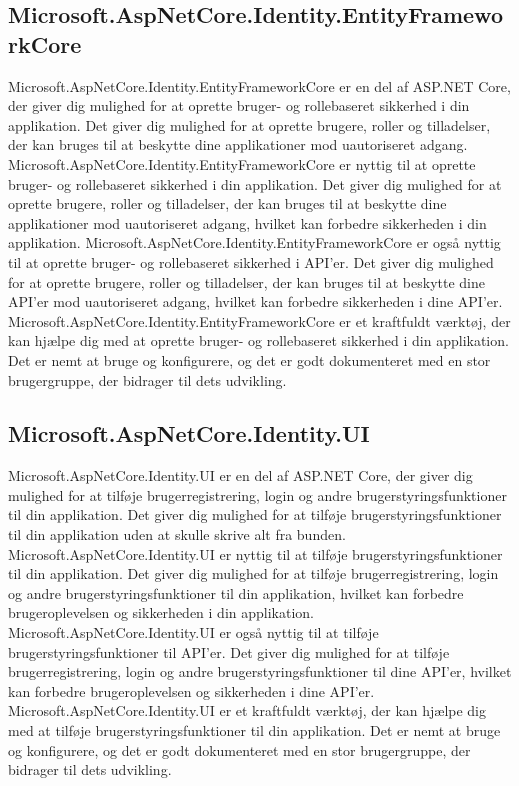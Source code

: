 \subsection{Microsoft.AspNetCore.Identity.EntityFrameworkCore}
Microsoft.AspNetCore.Identity.EntityFrameworkCore er en del af ASP.NET Core, der giver dig mulighed for at oprette bruger- og rollebaseret sikkerhed i din applikation. Det giver dig mulighed for at oprette brugere, roller og tilladelser, der kan bruges til at beskytte dine applikationer mod uautoriseret adgang.
Microsoft.AspNetCore.Identity.EntityFrameworkCore er nyttig til at oprette bruger- og rollebaseret sikkerhed i din applikation. Det giver dig mulighed for at oprette brugere, roller og tilladelser, der kan bruges til at beskytte dine applikationer mod uautoriseret adgang, hvilket kan forbedre sikkerheden i din applikation.
Microsoft.AspNetCore.Identity.EntityFrameworkCore er også nyttig til at oprette bruger- og rollebaseret sikkerhed i API'er. Det giver dig mulighed for at oprette brugere, roller og tilladelser, der kan bruges til at beskytte dine API'er mod uautoriseret adgang, hvilket kan forbedre sikkerheden i dine API'er.
Microsoft.AspNetCore.Identity.EntityFrameworkCore er et kraftfuldt værktøj, der kan hjælpe dig med at oprette bruger- og rollebaseret sikkerhed i din applikation. Det er nemt at bruge og konfigurere, og det er godt dokumenteret med en stor brugergruppe, der bidrager til dets udvikling.

\subsection{Microsoft.AspNetCore.Identity.UI}
Microsoft.AspNetCore.Identity.UI er en del af ASP.NET Core, der giver dig mulighed for at tilføje brugerregistrering, login og andre brugerstyringsfunktioner til din applikation. Det giver dig mulighed for at tilføje brugerstyringsfunktioner til din applikation uden at skulle skrive alt fra bunden.
Microsoft.AspNetCore.Identity.UI er nyttig til at tilføje brugerstyringsfunktioner til din applikation. Det giver dig mulighed for at tilføje brugerregistrering, login og andre brugerstyringsfunktioner til din applikation, hvilket kan forbedre brugeroplevelsen og sikkerheden i din applikation.
Microsoft.AspNetCore.Identity.UI er også nyttig til at tilføje brugerstyringsfunktioner til API'er. Det giver dig mulighed for at tilføje brugerregistrering, login og andre brugerstyringsfunktioner til dine API'er, hvilket kan forbedre brugeroplevelsen og sikkerheden i dine API'er.
Microsoft.AspNetCore.Identity.UI er et kraftfuldt værktøj, der kan hjælpe dig med at tilføje brugerstyringsfunktioner til din applikation. Det er nemt at bruge og konfigurere, og det er godt dokumenteret med en stor brugergruppe, der bidrager til dets udvikling.


